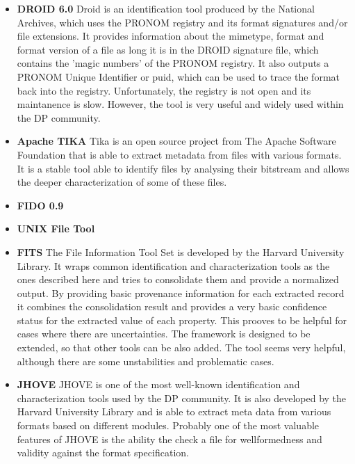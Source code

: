 \begin{itemize}
\item \textbf{DROID 6.0}\newline
Droid is an identification tool produced by the National Archives, which uses the PRONOM registry and its format signatures and/or file extensions. It provides information about the mimetype, format and format version of a file as long it is in the DROID signature file, which contains the 'magic numbers' of the PRONOM registry. It also outputs a PRONOM Unique Identifier or puid, which can be used to trace the format back into the registry.
Unfortunately, the registry is not open and its maintanence is slow. However, the tool is very useful and widely used within the DP community.

\item \textbf{Apache TIKA}\newline
Tika is an open source project from The Apache Software Foundation that is able to extract metadata from files with various formats. It is a stable tool able to identify files by analysing their bitstream and allows the deeper characterization of some of these files.  

\item \textbf{FIDO 0.9}\newline

\item \textbf{UNIX File Tool}\newline

\item \textbf{FITS} \newline
The File Information Tool Set is developed by the Harvard University Library. It wraps common identification and characterization tools as the ones described here and tries to consolidate them and provide a normalized output. By providing basic provenance information for each extracted record it combines the consolidation result and provides a very basic confidence status for the extracted value of each property. This prooves to be helpful for cases where there are uncertainties. The framework is designed to be extended, so that other tools can be also added. The tool seems very helpful, although there are some unstabilities and problematic cases.

\item \textbf{JHOVE}\newline
JHOVE is one of the most well-known identification and characterization tools used by the DP community. It is also developed by the Harvard University Library and is able to extract meta data from various formats based on different modules. Probably one of the most valuable features of JHOVE is the ability the check a file for wellformedness and validity against the format specification.


\end{itemize}

